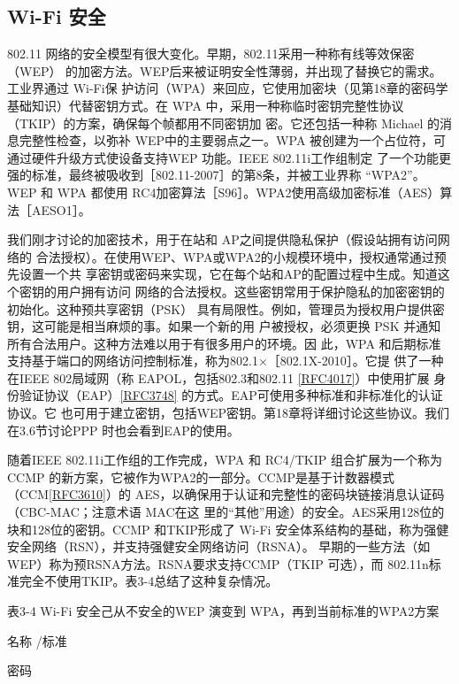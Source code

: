 \subsection{Wi-Fi 安全}

802.11 网络的安全模型有很大变化。早期，802.11采用一种称有线等效保密（WEP）
的加密方法。WEP后来被证明安全性薄弱，并出现了替换它的需求。工业界通过 Wi-Fi保
护访问（WPA）来回应，它使用加密块（见第18章的密码学基础知识）代替密钥方式。在
WPA 中，采用一种称临时密钥完整性协议（TKIP）的方案，确保每个帧都用不同密钥加
密。它还包括一种称 Michael 的消息完整性检查，以弥补 WEP中的主要弱点之一。WPA
被创建为一个占位符，可通过硬件升级方式使设备支持WEP 功能。IEEE 802.11i工作组制定
了一个功能更强的标准，最终被吸收到［802.11-2007］的第8条，并被工业界称 “WPA2”。
WEP 和 WPA 都使用 RC4加密算法［S96］。WPA2使用高级加密标准（AES）算法［AESO1］。

我们刚才讨论的加密技术，用于在站和 AP之间提供隐私保护（假设站拥有访问网络的
合法授权）。在使用WEP、WPA或WPA2的小规模环境中，授权通常通过预先设置一个共
享密钥或密码来实现，它在每个站和AP的配置过程中生成。知道这个密钥的用户拥有访问
网络的合法授权。这些密钥常用于保护隐私的加密密钥的初始化。这种预共享密钥（PSK）
具有局限性。例如，管理员为授权用户提供密钥，这可能是相当麻烦的事。如果一个新的用
户被授权，必须更换 PSK 并通知所有合法用户。这种方法难以用于有很多用户的环境。因
此，WPA 和后期标准支持基于端口的网络访问控制标准，称为802.1×［802.1X-2010］。它提
供了一种在IEEE 802局域网（称 EAPOL，包括802.3和802.11 \href{https://www.rfc-editor.org/rfc/rfc4017}{[RFC4017]}）中使用扩展
身份验证协议（EAP）\href{https://www.rfc-editor.org/rfc/rfc3748}{[RFC3748]} 的方式。EAP可使用多种标准和非标准化的认证协议。它
也可用于建立密钥，包括WEP密钥。第18章将详细讨论这些协议。我们在3.6节讨论PPP
时也会看到EAP的使用。

随着IEEE 802.11i工作组的工作完成，WPA 和 RC4/TKIP 组合扩展为一个称为CCMP
的新方案，它被作为WPA2的一部分。CCMP是基于计数器模式（CCM\href{https://www.rfc-editor.org/rfc/rfc3610}{[RFC3610]}）的
AES，以确保用于认证和完整性的密码块链接消息认证码（CBC-MAC；注意术语 MAC在这
里的“其他”用途）的安全。AES采用128位的块和128位的密钥。CCMP 和TKIP形成了
Wi-Fi 安全体系结构的基础，称为强健安全网络（RSN），并支持强健安全网络访问（RSNA）。
早期的一些方法（如WEP）称为预RSNA方法。RSNA要求支持CCMP（TKIP 可选），而
802.11n标准完全不使用TKIP。表3-4总结了这种复杂情况。

表3-4 Wi-Fi 安全己从不安全的WEP 演变到 WPA，再到当前标准的WPA2方案

名称 /标准

密码

